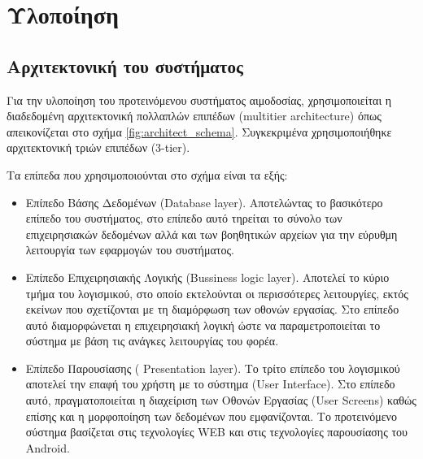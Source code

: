 \graphicspath{ {Figures/implementation/} }

\chapter{Υλοποίηση}\label{ch:Implementation}

\section{Αρχιτεκτονική του συστήματος}
Για την υλοποίηση του προτεινόμενου συστήματος αιμοδοσίας, χρησιμοποιείται η διαδεδομένη αρχιτεκτονική πολλαπλών επιπέδων (multitier architecture) όπως απεικονίζεται στο σχήμα \ref{fig:architect_schema}. Συγκεκριμένα χρησιμοποιήθηκε αρχιτεκτονική τριών επιπέδων (3-tier).

	Τα επίπεδα που χρησιμοποιούνται στο σχήμα είναι τα εξής:
	\begin{itemize}
	\item Επίπεδο Βάσης Δεδομένων (Database layer). Αποτελώντας το βασικότερο επίπεδο του συστήματος, στο επίπεδο αυτό τηρείται το σύνολο των επιχειρησιακών δεδομένων αλλά και των βοηθητικών αρχείων για την εύρυθμη λειτουργία των εφαρμογών του συστήματος.
	
	\item  Επίπεδο Επιχειρησιακής Λογικής (Bussiness logic layer). Αποτελεί το κύριο τμήμα του λογισμικού, στο οποίο εκτελούνται οι περισσότερες λειτουργίες, εκτός εκείνων που σχετίζονται με τη διαμόρφωση των οθονών εργασίας. Στο επίπεδο αυτό διαμορφώνεται η επιχειρησιακή λογική ώστε να παραμετροποιείται το σύστημα με βάση τις ανάγκες λειτουργίας του φορέα.
	
	\item Επίπεδο Παρουσίασης ( Presentation layer). Το τρίτο επίπεδο του λογισμικού αποτελεί την επαφή του χρήστη με το σύστημα (User Interface). Στο επίπεδο αυτό, πραγματοποιείται η διαχείριση των Οθονών Εργασίας (User Screens) καθώς επίσης και η μορφοποίηση των δεδομένων που εμφανίζονται. Το προτεινόμενο σύστημα βασίζεται στις τεχνολογίες WEB και στις τεχνολογίες παρουσίασης του Android.
	
	\end{itemize}

